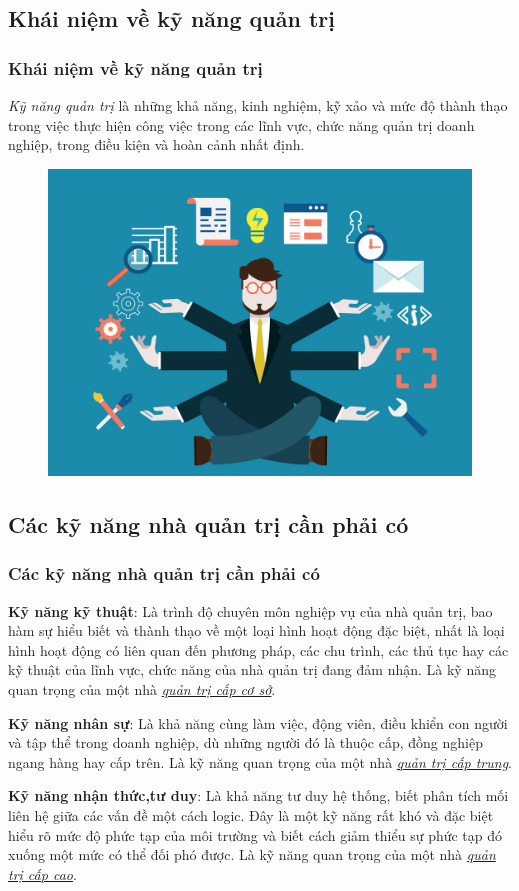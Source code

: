 \documentclass[10pt]{beamer}
\begin{document}
\subsection{Khái niệm về kỹ năng quản trị}
\begin{frame}
\transsplitverticalout
\frametitle{Khái niệm về kỹ năng quản trị}

\emph{Kỹ năng quản trị} là những khả năng, kinh nghiệm, kỹ xảo và mức độ thành thạo trong việc thực hiện công việc trong các lĩnh vực, chức năng quản trị doanh nghiệp, trong điều kiện và hoàn cảnh nhất định.
\begin{figure}
\centering
\includegraphics[scale=0.09]{Figs/fig5}
\end{figure}

\end{frame}


\subsection{Các kỹ năng nhà quản trị cần phải có}
\begin{frame}
\transblindshorizontal
\pause
\frametitle{Các kỹ năng nhà quản trị cần phải có}
\textbf{Kỹ năng kỹ thuật}: Là trình độ chuyên môn nghiệp vụ của nhà quản trị, bao hàm sự hiểu biết và thành thạo về một loại hình hoạt động đặc biệt, nhất là loại hình hoạt động có liên quan đến phương pháp, các chu trình, các thủ tục hay các kỹ thuật của lĩnh vực, chức năng của nhà quản trị đang đảm nhận. Là kỹ năng quan trọng của một nhà \underline{\emph{quản trị cấp cơ sở}}. 
\pause

\vspace{10pt}
\textbf{Kỹ năng nhân sự}: Là khả năng cùng làm việc, động viên, điều khiển con người và tập thể trong doanh nghiệp, dù những người đó là thuộc cấp, đồng nghiệp ngang hàng hay cấp trên. Là kỹ năng quan trọng của một nhà \underline{\emph{quản trị cấp trung}}. 
\pause

\vspace{10pt}
\textbf{Kỹ năng nhận thức,tư duy}: Là khả năng tư duy hệ thống, biết phân tích mối liên hệ giữa các vấn đề một cách logic. Đây là một kỹ năng rất khó và đặc biệt hiểu rõ mức độ phức tạp của môi trường và biết cách giảm thiểu sự phức tạp đó xuống một mức có thể đối phó được. Là kỹ năng quan trọng của một nhà \underline{\emph{quản trị cấp cao}}.
\end{frame}
\end{document}
